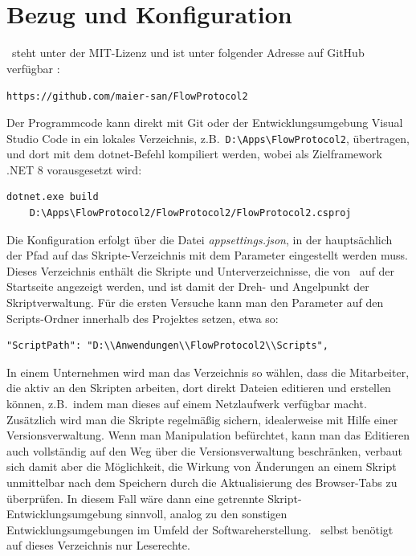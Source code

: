 \chapter{Bezug und Konfiguration}\label{BezugKonfig}
\FPZ\ steht unter der MIT-Lizenz und ist unter folgender Adresse auf GitHub verfügbar :
\begin{center}
    \texttt{https://github.com/maier-san/FlowProtocol2}
\end{center}

Der Programmcode kann direkt mit Git oder der Entwicklungsumgebung Visual Studio Code in ein lokales Verzeichnis, z.B.\ \verb|D:\Apps\FlowProtocol2|, übertragen, und dort  mit dem dotnet-Befehl kompiliert werden, wobei als Zielframework .NET 8 vorausgesetzt wird:
\begin{verbatim}
dotnet.exe build
    D:\Apps\FlowProtocol2/FlowProtocol2/FlowProtocol2.csproj
\end{verbatim}


Die Konfiguration erfolgt über die Datei \emph{appsettings.json}, in der hauptsächlich der Pfad auf das Skripte-Verzeichnis mit dem Parameter  eingestellt werden muss. Dieses Verzeichnis enthält die Skripte und Unterverzeichnisse, die von \FPZ\ auf der Startseite angezeigt werden, und ist damit der Dreh- und Angelpunkt der Skriptverwaltung. Für die ersten Versuche kann man den Parameter auf den Scripts-Ordner innerhalb des Projektes setzen, etwa so:
\begin{verbatim}
"ScriptPath": "D:\\Anwendungen\\FlowProtocol2\\Scripts", 
\end{verbatim}
In einem Unternehmen wird man das Verzeichnis so wählen, dass die Mitarbeiter, die aktiv an den Skripten arbeiten, dort direkt Dateien editieren und erstellen können, z.B.\ indem man dieses auf einem Netzlaufwerk verfügbar macht. Zusätzlich wird man die Skripte regelmäßig sichern, idealerweise mit Hilfe einer Versionsverwaltung. Wenn man Manipulation befürchtet, kann man das Editieren auch vollständig auf den Weg über die Versionsverwaltung beschränken, verbaut sich damit aber die Möglichkeit, die Wirkung von Änderungen an einem Skript unmittelbar nach dem Speichern durch die Aktualisierung des Browser-Tabs zu überprüfen. In diesem Fall wäre dann eine getrennte Skript-Entwicklungsumgebung sinnvoll, analog zu den sonstigen Entwicklungsumgebungen im Umfeld der Softwareherstellung. \FPZ\  selbst benötigt auf dieses Verzeichnis nur Leserechte.

